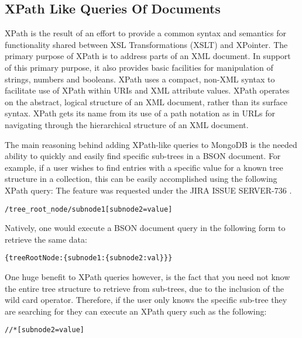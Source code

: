 \documentclass{dependencies/acm_proc_article-sp}
\begin{document}
\subsection{XPath Like Queries Of Documents}
XPath is the result of an effort to provide a common syntax and semantics for functionality shared between XSL Transformations (XSLT) and XPointer.
The primary purpose of XPath is to address parts of an XML document\cite{10}.
In support of this primary purpose, it also provides basic facilities for manipulation of strings, numbers and booleans.
XPath uses a compact, non-XML syntax to facilitate use of XPath within URIs and XML attribute values.
XPath operates on the abstract, logical structure of an XML document, rather than its surface syntax.
XPath gets its name from its use of a path notation as in URLs for navigating through the hierarchical structure of an XML document.

The main reasoning behind adding XPath-like queries to MongoDB is the needed ability to quickly and easily find specific sub-trees in a BSON document.
For example, if a user wishes to find entries with a specific value for a known tree structure in a collection, this can be easily accomplished using the following XPath query:
The feature was requested under the JIRA ISSUE SERVER-736 \cite{15}.

\begin{lstlisting}
/tree_root_node/subnode1[subnode2=value]
\end{lstlisting}
Natively, one would execute a BSON document query in the following form to retrieve the same data:
\begin{lstlisting}
{treeRootNode:{subnode1:{subnode2:val}}}
\end{lstlisting}
One huge benefit to XPath queries however, is the fact that you need not know the entire tree structure to retrieve from sub-trees, due to the inclusion of the wild card operator.
Therefore, if the user only knows the specific sub-tree they are searching for they can execute an XPath query such as the following:
\begin{lstlisting}
//*[subnode2=value]
\end{lstlisting}
\end{document}
